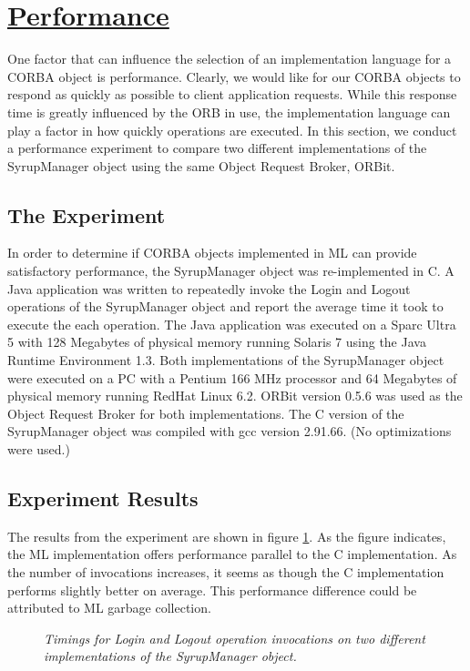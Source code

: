 \section*{\underline{Performance}}

One factor that can influence the selection of an implementation language for a 
CORBA object is performance.  Clearly, we would like for our CORBA objects to
respond as quickly as possible to client application requests.  While this response
time is greatly influenced by the ORB in use, the implementation language can 
play a factor in how quickly operations are executed.  In this section, 
we conduct a performance experiment to compare two different implementations 
of the SyrupManager object using the same Object Request Broker, ORBit.   

\subsection*{The Experiment}

In order to determine if CORBA objects implemented in ML can provide 
satisfactory performance,  the SyrupManager object was re-implemented in C.
A Java application was written to repeatedly invoke the Login and Logout 
operations of the SyrupManager object and report the average time it took 
to execute the each operation.  The Java application was executed on a 
Sparc Ultra 5 with 128 Megabytes of physical memory running Solaris 7 using the 
Java Runtime Environment 1.3.  Both implementations of the SyrupManager 
object were executed on a PC with a Pentium 166 MHz processor and 64 Megabytes 
of physical memory running RedHat Linux 6.2.  ORBit version 0.5.6 was used 
as the Object Request Broker for both implementations. The C version of the 
SyrupManager object was compiled with gcc version 2.91.66. (No optimizations 
were used.)  


\subsection*{Experiment Results}

The results from the experiment are shown in figure \ref{PerformanceResults}.
As the figure indicates, the ML implementation offers performance parallel to the 
C implementation.  As the number of invocations increases, it seems as though the 
C implementation performs slightly better on average.  This performance difference 
could be attributed to ML garbage collection.  
\begin{figure}
\begin{center}
\leavevmode
\caption{\em{Timings for Login and Logout operation invocations on two different implementations of the SyrupManager object}.}
\figline
         \label{PerformanceResults}
\end{center}
\end{figure}


